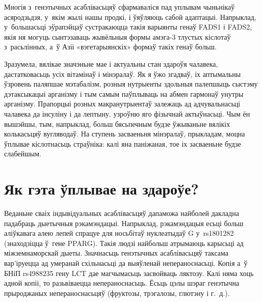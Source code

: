 Многія з~генэтычных асаблівасьцяў сфармаваліся пад уплывам чыньнікаў асяродзьдзя, у~якім жылі нашы продкі, і ўяўляюць сабой адаптацыі. Напрыклад, у~большасьці эўрапэйцаў сустракаюцца такія варыянты генаў FADS1 і FADS2, якія ня могуць сынтэзаваць жывёльныя формы амэга-3 тлустых кіслотаў з~расьлінных, а~ў Азіі «вэгетарыянскіх» формаў такіх генаў больш.

Зразумела, вялікае значэньне мае і актуальны стан здароўя чалавека, дастатковасьць усіх вітамінаў і мінэралаў. Як я ўжо згадваў, іх аптымальны ўзровень паляпшае мэтабалізм, розныя нутрыенты здольныя палепшыць сыстэму дэтаксыкацыі арганізму і тым самым паўплываць на абмен гармонаў унутры арганізму. Прапорцыі розных макранутрыентаў залежаць ад адчувальнасьці чалавека да інсуліну і да лептыну, узроўню яго фізычнай актыўнасьці. Чым ён вышэйшы, тым, напрыклад, больш бясьпечным будзе ўжываньне вялікіх колькасьцяў вугляводаў. На ступень засваеньня мінэралаў, прыкладам, моцна ўплывае кіслотнасьць страўніка: калі яна паніжаная, тое іх засваеньне будзе слабейшым.

\section{Як гэта ўплывае на здароўе?}

Веданьне сваіх індывідуальных асаблівасьцяў дапаможа найболей дакладна падабраць дыетычныя рэкамэндацыі. Напрыклад, рэкамэндацыя есьці больш аліўкавага алею лепей спрацуе для носьбітаў нуклеатыдаў G у~rs1801282 (знаходзіцца ў~гене PPARG). Такія людзі найбольш атрымаюць карысьці ад міжземнаморскай дыеты. Значнасьць генэтычных асаблівасьцяў таксама вар'іруецца ад умеранай схільнасьці да выяўленай непераноснасьці. Копія а~ў БНіП rs4988235 гену LCT дае магчымасьць засвойваць ляктозу. Калі няма хоць адной копіі, то разьвіваецца непераноснасьць. Ёсьць цэлы шэраг генэтычна прыроджаных непераноснасьцяў (фруктозы, трэгалозы, глютэну і г.~д.).


